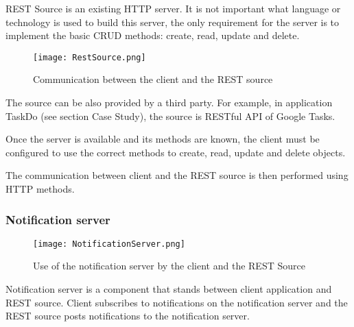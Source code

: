REST Source is an existing HTTP server. It is not important what language or technology is used to build this server, the only requirement for the server is to implement the basic CRUD methods: create, read, update and delete.

\begin{figure}[ht!]
\centering
\texttt{[image: RestSource.png]}
\caption{Communication between the client and the REST source \label{fig:4}}
\end{figure}

The source can be also provided by a third party. For example, in application TaskDo (see section Case Study), the source is RESTful API of Google Tasks. 

Once the server is available and its methods are known, the client must be configured to use the correct methods to create, read, update and delete objects.

The communication between client and the REST source is then performed using HTTP methods.

\subsubsection{Notification server}

\begin{figure}[ht!]
\centering
\texttt{[image: NotificationServer.png]}
\caption{Use of the notification server by the client and the REST Source \label{fig:5}}
\end{figure}

Notification server is a component that stands between client application and REST source. Client subscribes to notifications on the notification server and the REST source posts notifications to the notification server. 